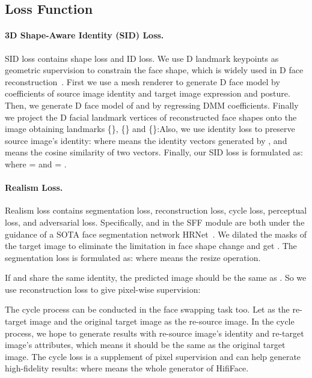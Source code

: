 \documentclass{article}
\begin{document}
\subsection{Loss Function}


\paragraph{3D Shape-Aware Identity (SID) Loss.} 
SID loss contains shape loss and ID loss. 
We use D landmark keypoints as geometric supervision to constrain the face shape, which is widely used in D face reconstruction~\cite{deng2019accurate}. 
First we use a mesh renderer to generate D face model by coefficients of source image identity and target image expression and posture. 
Then, we generate D face model of  and  by regressing DMM coefficients. 
Finally we project the D facial landmark vertices of reconstructed face shapes
onto the image obtaining landmarks \{{}\}, \{{}\} and \{{}\}:Also, we use identity loss to preserve source image's identity:
where  means the identity vectors generated by , and  means the cosine similarity of two vectors. 
Finally, our SID loss is formulated as:
where  =  and  = .


\paragraph{Realism Loss.} 
Realism loss contains segmentation loss, reconstruction loss, cycle loss, perceptual loss, and adversarial loss. 
Specifically,  and  in the SFF module are both under the guidance of a SOTA face segmentation network HRNet~\cite{sun2019high}. We dilated the masks of the target image to eliminate the limitation in face shape change and get . 
The segmentation loss is formulated as:
where  means the resize operation.

If  and  share the same identity, the predicted image should be the same as . So we use reconstruction loss to give pixel-wise supervision:




The cycle process can be conducted in the face swapping task too. Let  as the re-target image and the original target image as the re-source image. In the cycle process, we hope to generate results with re-source image's identity and re-target image's attributes, which means it should be the same as the original target image. The cycle loss is a supplement of pixel supervision and can help generate high-fidelity results:
where  means the whole generator of HifiFace.
\end{document}

